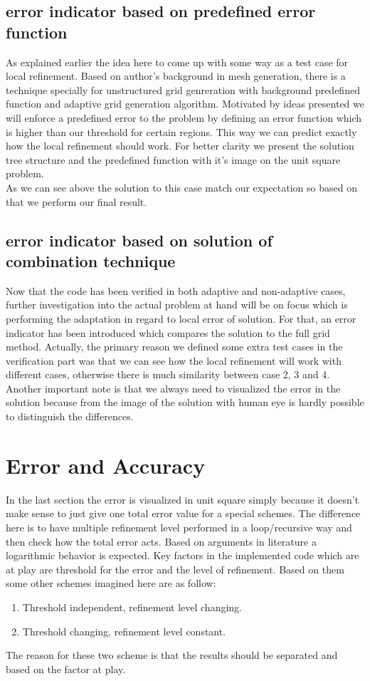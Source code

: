 \subsection{error indicator based on predefined error function}
As explained earlier the idea here to come up with some way as a test case for local refinement. Based on author's background in mesh generation, there is a technique specially for unstructured grid genreration with background predefined function \cite{Henshaw1996} and adaptive grid generation algorithm\cite{Ebeida2010}. Motivated by ideas presented we will enforce a predefined error to the problem by defining an error function which is higher than our threshold for certain regions. This way we can predict exactly how the local refinement should work. For better clarity we present the solution tree structure and the predefined function with it's image on the unit square problem.\\ %
As we can see above the solution to this case match our expectation so based on that we perform our final result.
\subsection{error indicator based on solution of combination technique}
Now that the code has been verified in both adaptive and non-adaptive cases, further investigation into the actual problem at hand will be on focus which is performing the adaptation in regard to local error of solution. For that, an error indicator has been introduced which compares the solution to the full grid method. Actually, the primary reason we defined some extra test cases in the verification part was that we can see how the local refinement will work with different cases, otherwise there is much similarity between case 2, 3 and 4. \\

Another important note is that we always need to visualized the error in the solution because from the image of the solution with human eye is hardly possible to distinguish the differences.

\section{Error and Accuracy}
In the last section the error is visualized in unit square simply because it doesn't make sense to just give one total error value for a special schemes. The difference here is to have multiple refinement level performed in a loop/recursive way and then check how the total error acts. Based on arguments in literature a logarithmic behavior is expected. Key factors in the implemented code which are at play are threshold for the error and the level of refinement. Based on them some other schemes imagined here are as follow:
\begin{enumerate}
\item Threshold independent, refinement level changing.
\item Threshold changing, refinement level constant.
\end{enumerate}
The reason for these two scheme is that the results should be separated and based on the factor at play.


